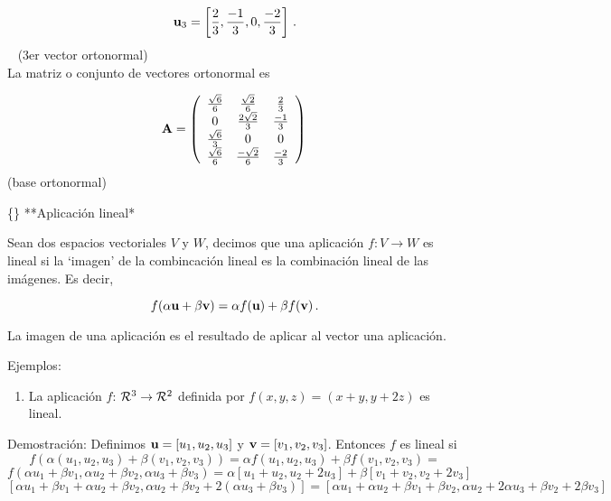 \documentclass[
]{agujournal2019}
\providecommand{\tightlist}{%
  \setlength{\itemsep}{0pt}\setlength{\parskip}{0pt}}\usepackage{longtable,booktabs,array}
\begin{document}
\[{\textbf u}_3=\left[ \frac{2}{3},\frac{-1}{3},0,\frac{-2}{3}\right]\,.\]
~ (3er vector ortonormal)\\

La matriz o conjunto de vectores ortonormal es

\[{\textbf A}=\left(\begin{array}{cccc}
  \frac{\sqrt{6}}{6} & \frac{\sqrt{2}}{6} & \frac{2}{3}\\
  0 & \frac{2\sqrt{2}}{3} & \frac{-1}{3}\\
  \frac{\sqrt{6}}{3} & 0 & 0\\
  \frac{\sqrt{6}}{6} & \frac{-\sqrt{2}}{6} & \frac{-2}{3}\\
\end{array}
  \right)
\,\] (base ortonormal)

\vspace{0.5cm}

\{\noindent\} **Aplicación lineal*

Sean dos espacios vectoriales \(V\) y \(W\), decimos que una aplicación
\(f:V \rightarrow W\) es lineal si la `imagen' de la combincación lineal
es la combinación lineal de las imágenes. Es decir,

\[f(\alpha {\textbf u} + \beta {\textbf v} )=\alpha f({\textbf u}) + \beta f({\textbf v})\,.\]

La imagen de una aplicación es el resultado de aplicar al vector una
aplicación.

Ejemplos:

\vspace{0.5cm}

\begin{enumerate}
\def\labelenumi{(\arabic{enumi})}
\tightlist
\item
  La aplicación \(f\): \({\cal R}^3 \rightarrow {\cal R}^2\) definida
  por \(f(x,y,z)=(x+y,y+2z)\) es lineal.
\end{enumerate}

Demostración: Definimos \({\textbf u}=[u_1,u_2,u_3]\) y
\({\textbf v}=[v_1,v_2,v_3]\). Entonces \(f\) es lineal si
\[f(\alpha (u_1,u_2,u_3) + \beta(v_1,v_2,v_3))=\alpha f(u_1,u_2,u_3) + \beta f(v_1,v_2,v_3)=\]
\[f(\alpha u_1 + \beta v_1,\alpha u_2 + \beta v_2,\alpha u_3 + \beta v_3 )=\alpha [u_1 + u_2,u_2 + 2u_3] +
\beta [v_1 + v_2,v_2 + 2v_3]\]
\[[\alpha u_1 + \beta v_1 + \alpha u_2 + \beta v_2,\alpha u_2 + \beta v_2 + 2 (\alpha u_3 + \beta v_3)]=
[\alpha u_1 + \alpha u_2 + \beta v_1 + \beta v_2, \alpha u_2 + 2\alpha u_3 + \beta v_2 + 2\beta v_3]\]

\vspace{0.5cm}
\end{document}
